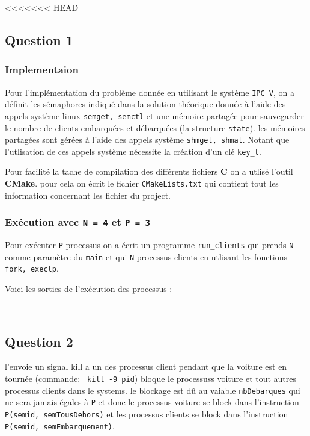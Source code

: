 <<<<<<< HEAD
\subsection{Question 1}
\subsubsection{Implementaion}
Pour l'implémentation du problème donnée en utilisant le système \texttt{IPC V},
on a définit les sémaphores indiqué dans la solution théorique donnée à l'aide
des appels système  linux \texttt{semget, semctl} et une mémoire partagée pour
sauvegarder le nombre de clients embarquées et débarquées (la structure
\texttt{state}). les mémoires partagées sont gérées à l'aide des appels système 
\texttt{shmget, shmat}. Notant que l'utlisation de ces appels système nécessite la création d'un clé \texttt{key\_t}.

Pour facilité la tache de compilation des différents fichiers \textbf{C} on a
utlisé l'outil \textbf{CMake}. pour cela on écrit le fichier
\texttt{CMakeLists.txt} qui contient tout les information concernant les fichier
du project.

\subsubsection{Exécution avec \texttt{N = 4} et \texttt{P = 3}}
Pour exécuter \texttt{P} processus on a écrit un programme \texttt{run\_clients}
qui prends \texttt{N} comme  paramètre du \texttt{main} et qui \texttt{N}
processus clients en utlisant les fonctions \texttt{fork, execlp}.

Voici les sorties de l'exécution des processus :




=======
\subsection{Question 2}
l'envoie un signal kill a un des processus client pendant que la
voiture est en tournée (commande: \texttt{ kill -9 pid}) bloque le processuss
voiture et tout autres processus clients dans le systems. le
blockage est dû au vaiable \texttt{nbDebarques} qui ne sera jamais égales à
\texttt{P} et donc le processus voiture se block dans l'instruction
\texttt{P(semid, semTousDehors)} et les processus clients se block dans
l'instruction \texttt{P(semid, semEmbarquement)}.


